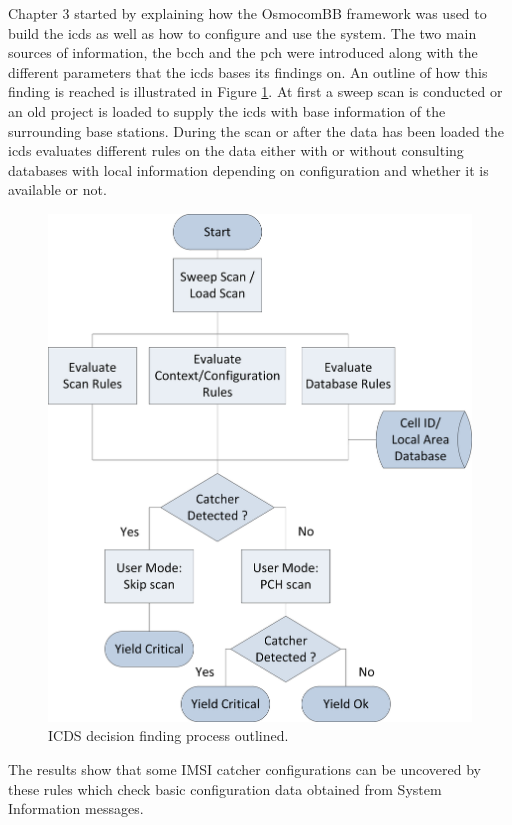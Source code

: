 Chapter 3 started by explaining how the OsmocomBB framework was used to build the \gls{icds} as well as how to configure and use the system.
The two main sources of information, the \gls{bcch} and the \gls{pch} were introduced along with the different parameters that the \gls{icds} bases its findings on.
An outline of how this finding is reached is illustrated in Figure \ref{fig:decision_process}.
At first a sweep scan is conducted or an old project is loaded to supply the \gls{icds} with base information of the surrounding base stations.
During the scan or after the data has been loaded the \gls{icds} evaluates different rules on the data either with or without consulting databases with local information depending on configuration and whether it is available or not.
\begin{figure}
\centering
\includegraphics{../Images/flowchart}
\caption{ICDS decision finding process outlined.}
\label{fig:decision_process}
\end{figure}
The results show that some IMSI catcher configurations can be uncovered by these rules which check basic configuration data obtained from System Information messages.
